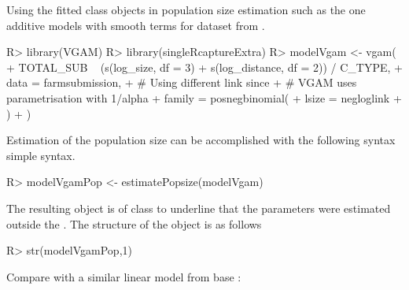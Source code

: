 \documentclass[
]{jss}
\newcommand{\1}{\mathcal{I}} \newcommand{\bZero}{\boldsymbol{0}}
\begin{document}
Using the fitted  class objects in
population size estimation such as the one additive models with smooth
terms for dataset from \cite{chao-generalization}.

\begin{CodeChunk}
\begin{CodeInput}
R> library(VGAM)
R> library(singleRcaptureExtra)
R> modelVgam <- vgam(
+   TOTAL_SUB ~ (s(log_size, df  = 3) + s(log_distance, df  = 2)) / C_TYPE,
+   data = farmsubmission,
+   # Using different link since
+   # VGAM uses parametrisation with 1/alpha
+   family = posnegbinomial(
+     lsize = negloglink
+   )
+ )
\end{CodeInput}
\end{CodeChunk}

Estimation of the population size can be accomplished with the following
syntax simple syntax.

\begin{CodeChunk}
\begin{CodeInput}
R> modelVgamPop <- estimatePopsize(modelVgam)
\end{CodeInput}
\end{CodeChunk}

The resulting object is of class  to underline that
the parameters were estimated outside the . The
structure of the object is as follows

\begin{CodeChunk}
\begin{CodeInput}
R> str(modelVgamPop,1)
\end{CodeInput}
\end{CodeChunk}

Compare with a similar linear model from base :
\small
\end{document}
